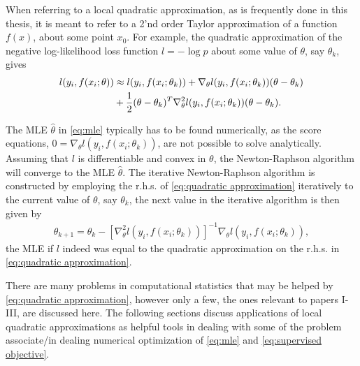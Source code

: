 When referring to a local quadratic approximation, as is frequently done in this thesis, it is meant to refer to a 2'nd order Taylor approximation of a function $f(x)$, about some point $x_0$.
For example, the quadratic approximation of the negative log-likelihood loss function $l=-\log p$ about some value of $\theta$, say $\theta_k$, gives
\begin{align}\label{eq:quadratic approximation}
	l(y_i,f(x_i;\theta))
	&\approx
	l(y_i,f(x_i;\theta_k))
	+ \nabla_\theta l(y_i,f(x_i;\theta_k)) (\theta-\theta_k)\notag\\
	&+ \frac{1}{2}(\theta-\theta_k)^T \nabla_\theta^2 l(y_i,f(x_i;\theta_k)) (\theta-\theta_k).
\end{align}

\begin{Example}\label{ex:newton-raphson}
	The MLE $\hat{\theta}$ in \eqref{eq:mle} typically has to be found numerically, as 
	the score equations, $0=\nabla_\theta l(y_i,f(x_i;\theta_k))$, are not possible to solve 
	analytically. Assuming that $l$ is differentiable and convex in $\theta$, the Newton-Raphson algorithm will converge to the MLE $\hat{\theta}$. 
	The iterative Newton-Raphson algorithm is constructed by employing the r.h.s. of \eqref{eq:quadratic approximation} iteratively to the current value of $\theta$, say $\theta_k$, the next value in the iterative algorithm is then given by 
	\begin{align*}
		\theta_{k+1} = \theta_k 
		- \left[\nabla_\theta^2 l(y_i,f(x_i;\theta_k))\right]^{-1}
		\nabla_\theta l(y_i,f(x_i;\theta_k)),
	\end{align*}
	the MLE if $l$ indeed was equal to the quadratic approximation on the r.h.s. in \eqref{eq:quadratic approximation}.
\end{Example}

There are many problems in computational statistics that may be helped by \eqref{eq:quadratic approximation}, however only a few, the ones relevant to papers I-III, are discussed here.
The following sections discuss applications of local quadratic approximations as helpful tools in dealing with some of the problem associate/in dealing numerical optimization of \eqref{eq:mle} and \eqref{eq:supervised objective}.

